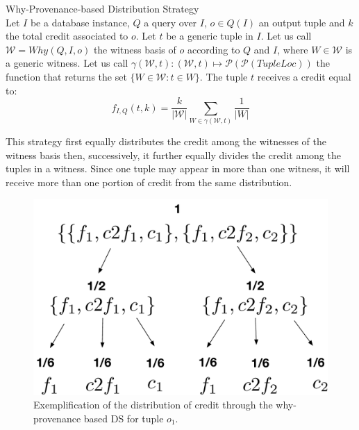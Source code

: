  \begin{definition}{Why-Provenance-based Distribution Strategy}\\
        \label{def:why_distribution}
    Let $I$ be a database instance, $Q$ a query over $I$, $o \in Q(I)$ an output tuple and $k$ the total credit associated to $o$. Let $t$ be a generic tuple in $I$.
    Let us call $\mathcal{W} = Why(Q, I, o)$ the witness basis of $o$ according to $Q$ and $I$, where $W \in \mathcal{W}$ is a generic witness. 
    Let us call $\gamma(\mathcal{W}, t): (\mathcal{W}, t) \mapsto \mathcal{P}(\mathcal{P}(TupleLoc))$ the function that returns the set 
    $\{W \in \mathcal{W} : t \in W\}$.
    The tuple $t$ receives a credit equal to:
    \begin{equation*}
        f_{I, Q}(t, k) =
            \frac{k}{|\mathcal{W}|}\sum_{W \in \gamma(\mathcal{W}, t)}\frac{1}{|W|}
    \end{equation*}
\end{definition}
This strategy first equally distributes the credit among the witnesses of the witness basis then, successively, it further equally divides the credit among the tuples in a witness. 
Since one tuple may appear in more than one witness, it will receive more than one portion of credit from the same distribution. 

\begin{figure}[]
\centering
  \includegraphics[width=.45\textwidth]{figures/why_distribution}
  \caption{Exemplification of the distribution of credit through the why-provenance based DS for tuple $o_1$.}
  \label{figure:why_prov_distribution}
\end{figure}

